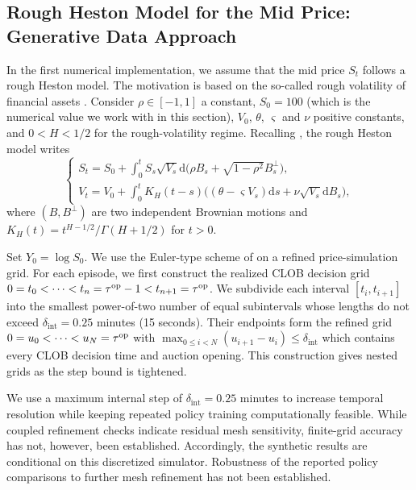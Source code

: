 \documentclass[11pt]{article}
\begin{document}
\subsection{Rough Heston Model for the Mid Price: Generative Data Approach}
\label{sub:rough}

In the first numerical implementation, we assume that the mid price $S_t$ follows a rough Heston model. The motivation is based on the so-called rough volatility of financial assets \cite{gatheral2022volatility,bäuerle2020portfolio,abi2019multifactor}. Consider $\rho \in [-1,1]$ a constant, $S_0 = 100$ (which is the numerical value we work with in this section), {$V_0$, $\theta$, $\varsigma$ and $\nu$ positive constants, and $0<H<1/2$ for the rough-volatility regime.} Recalling \cite{gatheral2022volatility,richard2023discrete}, the rough Heston model writes
\[\left\{\begin{array}{l}
    S_t = S_0 + \int_0^t S_s \sqrt{V_s}\mathrm{d}\big( \rho B_s + \sqrt{1-\rho^2}B_s^\perp\big), \\
    V_t = V_0 + \int_0^t K_H(t-s)\big ((\theta-\varsigma V_s)\mathrm{d}s + \nu \sqrt{V_s}\mathrm{d}B_s \big),
\end{array}\right.\]
where $(B,B^\perp)$ are two independent Brownian motions and $K_H(t) = t^{H-1/2}/\Gamma(H+1/2)$ for $t>0$. \vspace{0.5em}

Set $Y_0=\log S_0$. We use the Euler-type scheme of \cite{richard2023discrete} on a refined price-simulation grid. For each episode, we first construct the realized CLOB decision grid $0=t_0<\cdots<t_n={\tau^{\mathrm{op}}}-1<t_{n+1}=\tau^{\mathrm{op}}$. We subdivide each interval $[t_i,t_{i+1}]$ into the smallest power-of-two number of equal subintervals whose lengths do not exceed $\delta_{\mathrm{int}}=0.25$ minutes (15 seconds). Their endpoints form the refined grid $0=u_0<\cdots<u_N=\tau^{\mathrm{op}}$ with $\max_{0\leq i<N}(u_{i+1}-u_i)\leq\delta_{\mathrm{int}}$ which contains every CLOB decision time and auction opening. This construction gives nested grids as the step bound is tightened.

\begin{remark}
    We use a maximum internal step of $\delta_{\mathrm{int}}=0.25$ minutes to increase temporal resolution while keeping repeated policy training computationally feasible. While coupled refinement checks indicate residual mesh sensitivity, finite-grid accuracy has not, however, been established. Accordingly, the synthetic results are conditional on this discretized simulator. Robustness of the reported policy comparisons to further mesh refinement has not been established.
\end{remark}
\end{document}

